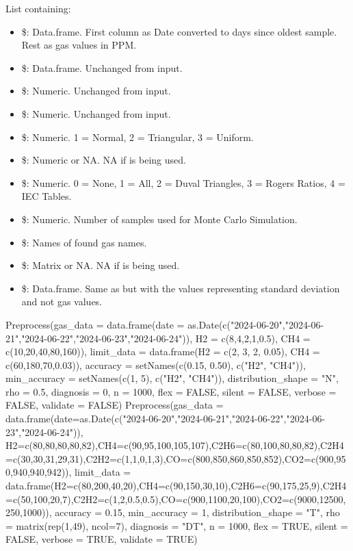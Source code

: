 \documentclass[a4paper]{book}
\begin{document}
%
\begin{Value}
List containing:
\begin{itemize}

\item{} \$: Data.frame. First column as Date converted to days since oldest sample. Rest as gas values in PPM.
\item{} \$: Data.frame. Unchanged from input.
\item{} \$: Numeric. Unchanged from input.
\item{} \$: Numeric. Unchanged from input.
\item{} \$: Numeric. 1 = Normal, 2 = Triangular, 3 = Uniform.
\item{} \$: Numeric or NA. NA if  is being used.
\item{} \$: Numeric. 0 = None, 1 = All, 2 = Duval Triangles, 3 = Rogers Ratios, 4 = IEC Tables.
\item{} \$: Numeric. Number of samples used for Monte Carlo Simulation.
\item{} \$: Names of found gas names.
\item{} \$: Matrix or NA. NA if  is being used.
\item{} \$: Data.frame. Same as  but with the values representing standard deviation and not gas values.

\end{itemize}

\end{Value}
%
\begin{Examples}
\begin{ExampleCode}
Preprocess(gas_data = data.frame(date = as.Date(c("2024-06-20","2024-06-21","2024-06-22","2024-06-23","2024-06-24")), H2 = c(8,4,2,1,0.5), CH4 = c(10,20,40,80,160)),
           limit_data = data.frame(H2 = c(2, 3, 2, 0.05), CH4 = c(60,180,70,0.03)),
           accuracy = setNames(c(0.15, 0.50), c("H2", "CH4")),
           min_accuracy = setNames(c(1, 5), c("H2", "CH4")),
           distribution_shape = "N",
           rho = 0.5,
           diagnosis = 0,
           n = 1000,
           flex = FALSE, silent = FALSE, verbose = FALSE, validate = FALSE)
Preprocess(gas_data = data.frame(date=as.Date(c("2024-06-20","2024-06-21","2024-06-22","2024-06-23","2024-06-24")), H2=c(80,80,80,80,82),CH4=c(90,95,100,105,107),C2H6=c(80,100,80,80,82),C2H4=c(30,30,31,29,31),C2H2=c(1,1,0,1,3),CO=c(800,850,860,850,852),CO2=c(900,950,940,940,942)),
           limit_data = data.frame(H2=c(80,200,40,20),CH4=c(90,150,30,10),C2H6=c(90,175,25,9),C2H4=c(50,100,20,7),C2H2=c(1,2,0.5,0.5),CO=c(900,1100,20,100),CO2=c(9000,12500,250,1000)),
           accuracy = 0.15,
           min_accuracy = 1,
           distribution_shape = "T",
           rho = matrix(rep(1,49), ncol=7),
           diagnosis = "DT",
           n = 1000,
           flex = TRUE, silent = FALSE, verbose = TRUE, validate = TRUE)
\end{ExampleCode}
\end{Examples}
\end{document}
